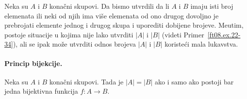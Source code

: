 Neka su $A$ i $B$ kona\v cni skupovi. Da bismo utvrdili da li $A$ i $B$ imaju isti broj elemenata
ili neki od njih ima vi\v se elemenata od ono drugog dovoljno je prebrojati elemente jednog i drugog skupa
i uporediti dobijene brojeve. Me\dj utim, postoje situacije u kojima nije lako utvrditi $|A|$ i $|B|$
(videti Primer~\ref{ft08.ex.22-34}), ali se ipak mo\v ze utvrditi odnos brojeva $|A|$ i $|B|$ koriste\'ci
mala lukavstva.

\paragraph{Princip bijekcije.}
  Neka su $A$ i $B$ kona\v cni skupovi. Tada je $|A| = |B|$ ako i samo ako postoji bar jedna bijektivna funkcija $f : A \to B$.
\begin{center}
  
\end{center}

